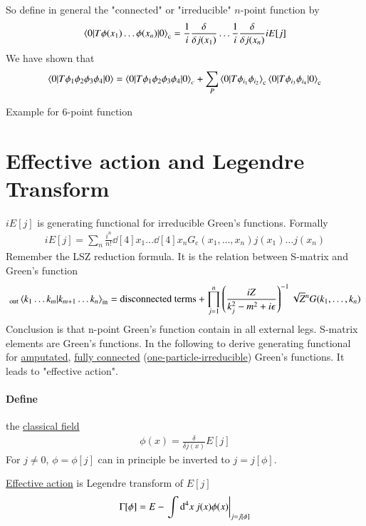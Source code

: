 So define in general the "connected" or "irreducible" $n$-point function by
\begin{align}
   \braket{0 | T\phi(x_1) \dots \phi(x_n) | 0 }_\text{c} = \frac{1}{i} \frac{\delta}{\delta j(x_1)} \dots \frac{1}{i} \frac{\delta}{\delta j(x_n)} i E[j]
\end{align}
We have shown that
\begin{align*}
   \braket{0 | T \phi_1 \phi_2 \phi_3 \phi_4 | 0} = \braket{0 | T \phi_1 \phi_2 \phi_3 \phi_4 | 0}_c + \sum_{P} \braket{0 | T\phi_{i_1}\phi_{i_2}}_\text{c} \braket{0 | T \phi_{i_3} \phi_{i_4} | 0}_\text{c}
\end{align*}

Example for $6$-point function

\section{Effective action and Legendre Transform}
$iE[j]$ is generating functional for irreducible Green's functions. Formally 
\begin{align}
   iE[j] = \sum_n \frac{i^n}{n!} \dd[4]{x_1} \dots \dd[4]{x_n} G_\text{c}(x_1,\dots,x_n) j(x_1) \dots j(x_n)
\end{align} 
Remember the LSZ reduction formula. It is the relation between S-matrix and Green's function
\begin{align}
   {}_{\text{out}} \braket{k_1 \dots k_m | k_{m+1} \dots k_n}_{\text{in}} = \text{disconnected terms} + \prod_{j=1}^n \left( \frac{iZ}{k^2_j - m^2 +i \epsilon} \right)^{-1} \sqrt{Z}^n G(k_1, \dots, k_n)
\end{align} 
Conclusion is that n-point Green's function contain  in all external legs. S-matrix elements are  Green's functions.
In the following to derive generating functional for \underline{amputated}, \underline{fully connected} (\underline{one-particle-irreducible}) Green's functions. It leads to "effective action".

\paragraph{Define} the \underline{classical field}
\begin{align}
   \phi(x) = \frac{\delta}{\delta j(x)} E[j]
\end{align}
For $j \neq 0$, $\phi=\phi[j]$ can in principle be inverted to $j=j[\phi]$.

\underline{Effective action} is Legendre transform of $E[j]$
\begin{align}
   \Gamma[\phi] = E - \eval{\int \dd[4]{x} j(x) \phi(x)}_{j=j[\phi]}
\end{align}

